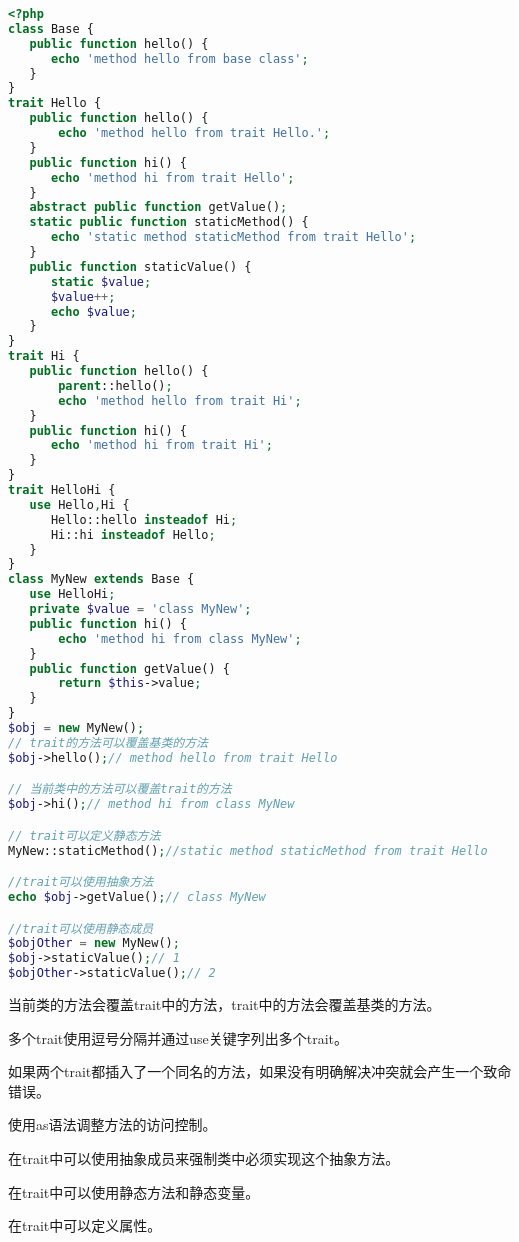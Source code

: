 \begin{lstlisting}[language=PHP]
<?php
class Base {
   public function hello() {
      echo 'method hello from base class';
   }
}
trait Hello {
   public function hello() {
       echo 'method hello from trait Hello.';
   }
   public function hi() {
      echo 'method hi from trait Hello';
   }
   abstract public function getValue();
   static public function staticMethod() {
      echo 'static method staticMethod from trait Hello';
   }
   public function staticValue() {
      static $value;
      $value++;
      echo $value;
   }
}
trait Hi {
   public function hello() {
       parent::hello();
       echo 'method hello from trait Hi';
   }
   public function hi() {
      echo 'method hi from trait Hi';
   }
}
trait HelloHi {
   use Hello,Hi {
      Hello::hello insteadof Hi;
      Hi::hi insteadof Hello;
   }
}
class MyNew extends Base {
   use HelloHi;
   private $value = 'class MyNew';
   public function hi() {
       echo 'method hi from class MyNew';
   }
   public function getValue() {
       return $this->value;
   }
}
$obj = new MyNew();
// trait的方法可以覆盖基类的方法
$obj->hello();// method hello from trait Hello

// 当前类中的方法可以覆盖trait的方法
$obj->hi();// method hi from class MyNew

// trait可以定义静态方法
MyNew::staticMethod();//static method staticMethod from trait Hello

//trait可以使用抽象方法
echo $obj->getValue();// class MyNew

//trait可以使用静态成员
$objOther = new MyNew();
$obj->staticValue();// 1
$objOther->staticValue();// 2
\end{lstlisting}

\begin{compactitem}
\item 当前类的方法会覆盖trait中的方法，trait中的方法会覆盖基类的方法。
\item 多个trait使用逗号分隔并通过use关键字列出多个trait。
\item 如果两个trait都插入了一个同名的方法，如果没有明确解决冲突就会产生一个致命错误。

\item 使用as语法调整方法的访问控制。

\item 在trait中可以使用抽象成员来强制类中必须实现这个抽象方法。

\item 在trait中可以使用静态方法和静态变量。

\item 在trait中可以定义属性。

\end{compactitem}

